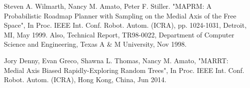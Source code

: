 \documentclass[12pt]{article}
\begin{document}
  
  \begin{thebibliography}{1}

   Steven A. Wilmarth, Nancy M. Amato, Peter F. Stiller. "MAPRM: A Probabilistic Roadmap Planner with Sampling on the Medial Axis of the Free Space", In Proc. IEEE Int. Conf. Robot. Autom. (ICRA), pp. 1024-1031, Detroit, MI, May 1999. Also, Technical Report, TR98-0022, Department of Computer Science and Engineering, Texas A \& M University, Nov 1998.

   Jory Denny, Evan Greco, Shawna L. Thomas, Nancy M. Amato, "MARRT: Medial Axis Biased Rapidly-Exploring Random Trees",  In Proc. IEEE Int. Conf. Robot. Autom. (ICRA), Hong Kong, China, Jun 2014.

  \end{thebibliography}
  
\end{document}
